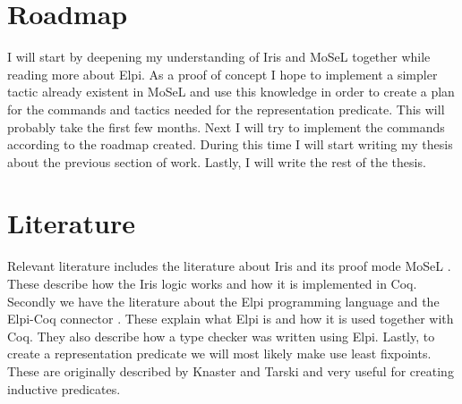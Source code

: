 \documentclass[11pt,a4paper,final]{report}
\begin{document}
\section*{Roadmap}
I will start by deepening my understanding of Iris and MoSeL together while reading more about Elpi. As a proof of concept I hope to implement a simpler tactic already existent in MoSeL and use this knowledge in order to create a plan for the commands and tactics needed for the representation predicate. This will probably take the first few months. Next I will try to implement the commands according to the roadmap created. During this time I will start writing my thesis about the previous section of work. Lastly, I will write the rest of the thesis.

\section*{Literature}
Relevant literature includes the literature about Iris and its proof mode MoSeL \cite*{jungIrisMonoidsInvariants2015a,jungHigherorderGhostState2016,krebbersEssenceHigherOrderConcurrent2017,jungIrisGroundModular2018,krebbersInteractiveProofsHigherorder2017,krebbersMoSeLGeneralExtensible2018,iristeamIrisReference2023}. These describe how the Iris logic works and how it is implemented in Coq. Secondly we have the literature about the Elpi programming language and the Elpi-Coq connector \cite{dunchevELPIFastEmbeddable2015,guidiImplementingTypeTheory2019}. These explain what Elpi is and how it is used together with Coq. They also describe how a type checker was written using Elpi. Lastly, to create a representation predicate we will most likely make use least fixpoints. These are originally described by Knaster and Tarski \cite{tarskiLatticetheoreticalFixpointTheorem1955} and very useful for creating inductive predicates.

\printbibliography
\end{document}

